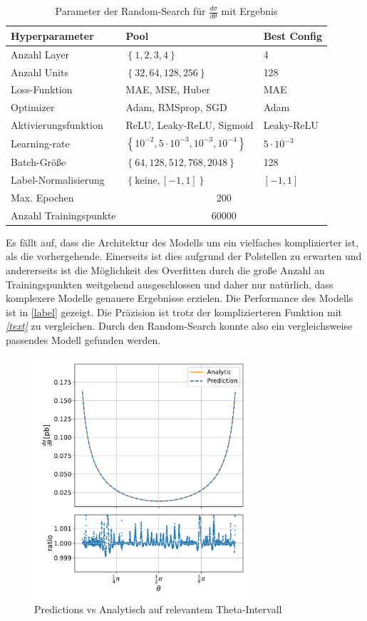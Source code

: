 \begin{table}
	\centering
	\begin{tabular}{|l|l|l|}
		\hline
		Hyperparameter & Pool & Best Config \\
		\hline
		Anzahl Layer & $\left\lbrace 1, 2, 3, 4 \right\rbrace$ & 4 \\
		Anzahl Units & $\left\lbrace 32, 64, 128, 256\right\rbrace$ & 128 \\
		Loss-Funktion & MAE, MSE, Huber & MAE \\
		Optimizer & Adam, RMSprop, SGD  & Adam\\
		Aktivierungsfunktion & ReLU, Leaky-ReLU, Sigmoid & Leaky-ReLU \\
		Learning-rate & $\left\lbrace 10^{-2}, 5 \cdot 10^{-3}, 10^{-3}, 10^{-4} \right\rbrace $ & $5 \cdot 10^{-3}$\\
		Batch-Größe & $\left\lbrace 64, 128, 512, 768, 2048 \right\rbrace $ & 128\\
		Label-Normalisierung & $\left\lbrace \text{keine}, [-1,1]\right\rbrace $ & $[-1,1]$\\
		\hline
		Max. Epochen & \multicolumn{2}{c|}{200}\\
		Anzahl Trainingspunkte & \multicolumn{2}{c|}{60000} \\
		\hline
	\end{tabular}
	\caption{Parameter der Random-Search für $\frac{d\sigma}{d\theta}$ mit Ergebnis}
\end{table}
Es fällt auf, dass die Architektur des Modells um ein vielfaches komplizierter ist, als die vorhergehende. Einerseits ist dies aufgrund der Polstellen zu erwarten und andererseits ist die Möglichkeit des Overfitten durch die große Anzahl an Trainingspunkten weitgehend ausgeschlossen und daher nur natürlich, dass komplexere Modelle genauere Ergebnisse erzielen. Die Performance des Modells ist in \textit{}\autoref{label} gezeigt. Die Präzision ist trotz der komplizierteren Funktion mit \textit{\autoref{text}} zu vergleichen. Durch den Random-Search konnte also ein vergleichsweise passendes Modell gefunden werden. \\
\begin{figure}[tbp]
	\centering
	\includegraphics[width=8cm]{graphics/2}
	\caption{Predictions vs Analytisch auf relevantem Theta-Intervall}
\end{figure}
